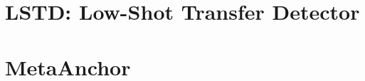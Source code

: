 \documentclass[11pt,twoside,a4paper]{ctexart}
\begin{document}
	\section{LSTD: Low-Shot Transfer Detector}
	
	\section{MetaAnchor}
	
\end{document}
